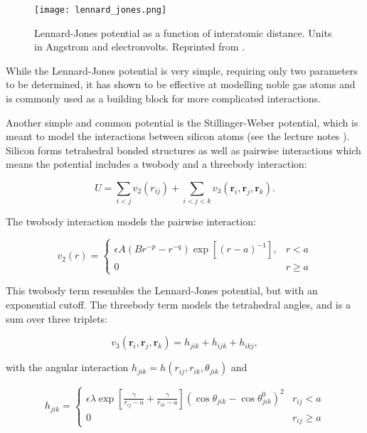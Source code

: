 \begin{figure}[H]
    \centering
    \texttt{[image: lennard\_jones.png]}
    \caption{Lennard-Jones potential as a function of interatomic distance.
        Units in Angstrom and electronvolts.
        Reprinted from \parencite[Molecular dynamics modelling of clay-fluid interfaces]
            {phdthesis}.}
    \label{fig:lennard-jones}
\end{figure}

\par
While the Lennard-Jones potential is very simple, requiring only two parameters
to be determined, it has shown to be effective at modelling noble gas atoms
and is commonly used as a building block for more complicated interactions.
\par
Another simple and common potential is the Stillinger-Weber potential,
which is meant to model the interactions between silicon atoms
(see the lecture notes \parencite[Abrams, Cameron]{che8002013}).
Silicon forms tetrahedral bonded structures as well as pairwise interactions
which means the potential includes a twobody and a threebody interaction:

\begin{equation}
    U = \sum_{i < j} v_2(r_{ij}) + \sum_{i < j < k} v_3(\bm{r}_i, \bm{r}_j, \bm{r}_k) .
\end{equation}

The twobody interaction models the pairwise interaction:

\begin{equation}
    v_2(r) =
    \begin{cases}
        \epsilon A (Br^{-p} - r^{-q}) \exp \left[ (r - a)^{-1} \right],
        & r < a \\
        0 & r \geq a
    \end{cases}
\end{equation}

This twobody term resembles the Lennard-Jones potential,
but with an exponential cutoff.
The threebody term models the tetrahedral angles,
and is a sum over three triplets:

\begin{equation}
    v_3(\bm{r}_i, \bm{r}_j, \bm{r}_k) = h_{jik} + h_{ijk} + h_{ikj} ,
\end{equation}

with the angular interaction $h_{jik} = h(r_{ij}, r_{ik}, \theta_{jik})$ and

\begin{equation}
    h_{jik} =
    \begin{cases}
        \displaystyle\epsilon \lambda \exp \left[ \frac{\gamma}{r_{ij} - a}
        + \frac{\gamma}{r_{ik} - a} \right]
        \left(\cos{\theta_{jik}} - \cos{\theta_{jik}^0} \right)^2 & r_{ij} < a \\[10pt]
        \displaystyle 0 & r_{ij} \geq a
    \end{cases}
\end{equation}

